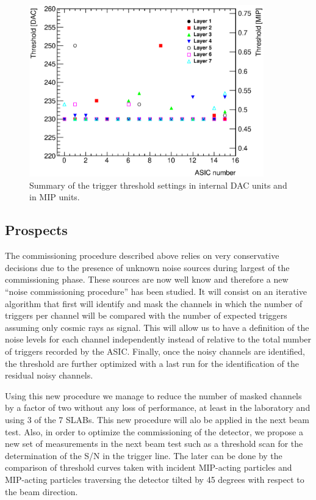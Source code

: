 \documentclass[a4paper,11pt]{article}
\begin{document}
\begin{figure}[!t]
  \centering
  \includegraphics[width=4in]{../figs/commissioning/threshold_chip.eps}
  \caption{Summary of the trigger threshold settings in internal DAC units and in MIP units.}
\label{trigger_thresholds}
\end{figure}


\subsection{Prospects}
\label{sec:comm_prospects}

The commissioning procedure described above relies on very conservative decisions
due to the presence of unknown noise sources during largest of the commissioning phase.
These sources are
now well know and therefore a new ``noise commissioning procedure'' has been studied.
It will consist on an iterative algorithm that first
will identify and mask the channels
in which the number of triggers per channel will be compared with the number of expected triggers
assuming only cosmic rays as signal. This will allow us to have a
definition of the noise levels for each channel independently
instead of relative to the total number of triggers recorded by
the ASIC. Finally, once the noisy channels
are identified, the threshold  are further optimized
with a last run for the identification of the residual noisy channels.

Using this new procedure we manage to reduce the number of masked channels by a factor of two
without any loss of performance, at least in the laboratory and using 3 of the 7 SLABs.
This new procedure will alo be applied in the next beam test.
Also, in order to
optimize the commissioning of the detector,
we propose a new set of measurements in the next beam test such as
a threshold scan for the determination of the S/N in the trigger line. The later
can be done by the comparison of threshold curves taken with incident MIP-acting particles
and MIP-acting particles traversing the detector tilted by 45 degrees with respect to the beam direction.
\end{document}
